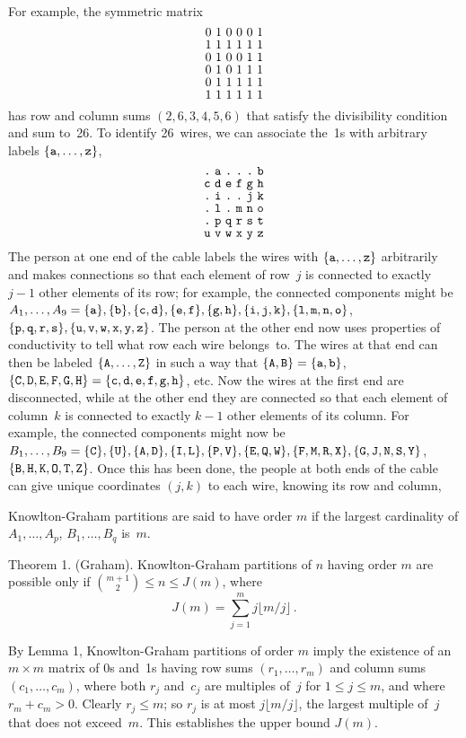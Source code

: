 \documentclass[a4paper,12pt]{article}
\begin{document}
{For example, the symmetric matrix
$$
\advance\baselineskip-2pt
\vcenter{\halign{\hfil#\hfil\ &\hfil#\hfil\ &\hfil#\hfil\ %
&\hfil#\hfil\ &\hfil#\hfil\ &\hfil#\hfil\cr
0&1&0&0&0&1\cr
1&1&1&1&1&1\cr
0&1&0&0&1&1\cr
0&1&0&1&1&1\cr
0&1&1&1&1&1\cr
1&1&1&1&1&1\cr}}$$
has row and column sums $(2,6,3,4,5,6)$ that satisfy the divisibility condition
and sum to~26. To identify 26~wires, we can associate the~1s with arbitrary
labels $\{\tt a,\ldots,\tt z\}$,
$$
\advance\baselineskip-2pt
\vcenter{\halign{\hfil{\tt#}\hfil\ &\hfil{\tt#}\hfil\ %
&\hfil{\tt#}\hfil\ &\hfil{\tt#}\hfil\ &\hfil{\tt#}\hfil\ %
&\hfil{\tt#}\hfil\cr
.&a&.&.&.&b\cr
c&d&e&f&g&h\cr
.&i&.&.&j&k\cr
.&l&.&m&n&o\cr
.&p&q&r&s&t\cr
u&v&w&x&y&z\cr}}$$
The person at one end of the cable labels the wires with
$\{\tt a,\ldots,\tt z\}$ arbitrarily and makes connections so that each element
of row~$j$ is connected to exactly $j-1$ other elements of its row; for
example, the connected components might be $A_1,\ldots,A_9=\{\tt a\},\{\tt b\},
\{\tt c,\tt d\},\{\tt e,\tt f\},\{\tt g,\tt h\},\{\tt i,\tt j,\tt k\},
\{\tt l,\tt m,\tt n,\tt o\}$,
$\{\tt p,\tt q,\tt r,\tt s\},\{\tt u,\tt v,\tt w,\tt x,\tt y,
\tt z\}$. The person at the other end now uses properties of conductivity
to tell what row each wire belongs~to. 
The wires at that end can then be labeled
$\{\tt A,\ldots,\tt Z\}$ in such a way that
$\{\tt A,\tt B\}=\{\tt a,\tt b\}$, $\{\tt C,\tt D,\tt E,\tt F,\tt G,\tt H\}
=\{\tt c,\tt d,\tt e,\tt f,\tt g,\tt h\}$, etc. Now the wires at the first end 
 are disconnected, while at the other end they are connected so that each
element of column~$k$ is connected to exactly $k-1$ other elements of its
column. For example, the connected components might now be $B_1,\ldots,B_9
=\{\tt C\},\{\tt U\},\{\tt A,\tt D\},\{\tt I,\tt L\},\{\tt P,\tt V\},
\{\tt E,\tt Q,\tt W\},\{\tt F,\tt M,\tt R,\tt X\},
\{\tt G,\tt J,\tt N,\tt S,\tt Y\}$,\break
$\{\tt B,\tt H,\tt K,\tt O,\tt T,\tt Z\}$. 
Once this has been done, the people at both ends of the cable
can give unique coordinates $(j,k)$ to each wire, knowing its row and column,

Knowlton-Graham partitions are said to have order $m$ if the largest
cardinality of $A_1,\ldots, A_p$, $B_1,\ldots,B_q$ is~$m$. 

\proclaim
Theorem 1. {\rm (Graham).}
Knowlton-Graham partitions of\/ $n$ having order\/ $m$ are possible only if\/
${m+1\choose 2}\leq n\leq J(m)$, where
$$J(m)=\sum_{j=1}^mj\lfloor m/j\rfloor\,.$$

\proof
By Lemma 1, Knowlton-Graham partitions of order $m$ imply the existence of an
$m\times m$ matrix of 0s and~1s having row sums $(r_1,\ldots,r_m)$ and column
sums $(c_1,\ldots,c_m)$, where both $r_j$ and~$c_j$ are multiples of~$j$ for
$1\leq j\leq m$, and where $r_m+c_m>0$. Clearly $r_j\leq m$; so $r_j$ is at
most $j\lfloor m/j\rfloor$, the largest multiple of~$j$ that does not
exceed~$m$. This establishes the upper bound $J(m)$.

}
\end{document}
